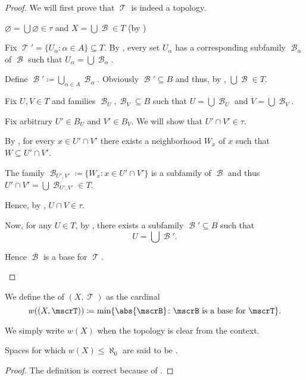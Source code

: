 \begin{proof}
  We will first prove that \( \mscrT \) is indeed a topology.

  \begin{refenum}
     \( \varnothing = \bigcup \varnothing \in \tau \) and \( X = \bigcup \mscrB \in T \) (by )

     Fix \( \mscrT' = \{ U_\alpha \colon \alpha \in A \} \subseteq T \). By , every set \( U_\alpha \) has a corresponding subfamily \( \mscrB_\alpha \) of \( \mscrB \) such that \( U_\alpha = \bigcup \mscrB_\alpha \).

    Define \( \mscrB' \coloneqq \bigcup_{\alpha \in A} \mscrB_\alpha \). Obviously \( \mscrB' \subseteq B \) and thus, by , \( \bigcup \mscrB \in T \).

     Fix \( U, V \in T \) and families \( \mscrB_U, \mscrB_V \subseteq B \) such that \( U = \bigcup \mscrB_U \) and \( V = \bigcup \mscrB_V \).

    Fix arbitrary \( U' \in B_U \) and \( V' \in B_V \). We will show that \( U' \cap V' \in \tau \).

    By , for every \( x \in U' \cap V' \) there exists a neighborhood \( W_x \) of \( x \) such that \( W \subseteq U' \cap V' \).

    The family \( \mscrB_{U',V'} \coloneqq \{ W_x \colon x \in U' \cap V' \} \) is a subfamily of \( \mscrB \) and thus \( U' \cap V' = \bigcup \mscrB_{U',V'} \in T \).

    Hence, by , \( U \cap V \in \tau \).

    Now, for any \( U \in T \), by , there exists a subfamily \( \mscrB' \subseteq B \) such that
    \begin{equation*}
      U = \bigcup \mscrB'.
    \end{equation*}

    Hence \( \mscrB \) is a base for \( \mscrT \).
  \end{refenum}
\end{proof}

\begin{definition}\label{def:topological_space_weight}
  We define the  of \( (X, \mscrT) \) as the cardinal
  \begin{equation*}
    w((X, \mscrT)) \coloneqq \min \{ \abs{\mscrB} \colon \mscrB \text{ is a base for } \mscrT \}.
  \end{equation*}

  We simply write \( w(X) \) when the topology is clear from the context.

  Spaces for which \( w(X) \leq \aleph_0 \) are said to be .
\end{definition}
\begin{proof}
  The definition is correct because of .
\end{proof}

